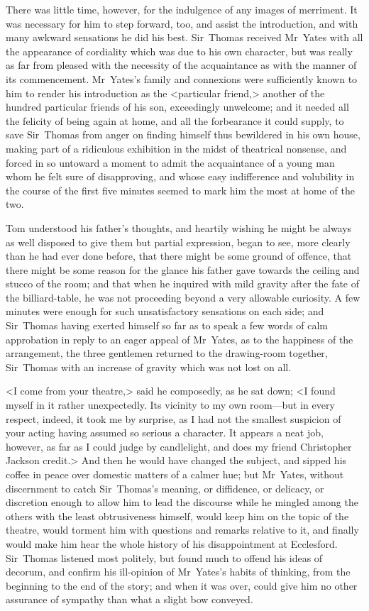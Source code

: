 There was little time, however, for the indulgence of any images of merriment. It was necessary for him to step forward, too, and assist the introduction, and with many awkward sensations he did his best. Sir~Thomas received Mr~Yates with all the appearance of cordiality which was due to his own character, but was really as far from pleased with the necessity of the acquaintance as with the manner of its commencement. Mr~Yates's family and connexions were sufficiently known to him to render his introduction as the <particular friend,> another of the hundred particular friends of his son, exceedingly unwelcome; and it needed all the felicity of being again at home, and all the forbearance it could supply, to save Sir~Thomas from anger on finding himself thus bewildered in his own house, making part of a ridiculous exhibition in the midst of theatrical nonsense, and forced in so untoward a moment to admit the acquaintance of a young man whom he felt sure of disapproving, and whose easy indifference and volubility in the course of the first five minutes seemed to mark him the most at home of the two.

Tom understood his father's thoughts, and heartily wishing he might be always as well disposed to give them but partial expression, began to see, more clearly than he had ever done before, that there might be some ground of offence, that there might be some reason for the glance his father gave towards the ceiling and stucco of the room; and that when he inquired with mild gravity after the fate of the billiard-table, he was not proceeding beyond a very allowable curiosity. A few minutes were enough for such unsatisfactory sensations on each side; and Sir~Thomas having exerted himself so far as to speak a few words of calm approbation in reply to an eager appeal of Mr~Yates, as to the happiness of the arrangement, the three gentlemen returned to the drawing-room together, Sir~Thomas with an increase of gravity which was not lost on all.

<I come from your theatre,> said he composedly, as he sat down; <I found myself in it rather unexpectedly. Its vicinity to my own room—but in every respect, indeed, it took me by surprise, as I had not the smallest suspicion of your acting having assumed so serious a character. It appears a neat job, however, as far as I could judge by candlelight, and does my friend Christopher Jackson credit.> And then he would have changed the subject, and sipped his coffee in peace over domestic matters of a calmer hue; but Mr~Yates, without discernment to catch Sir~Thomas's meaning, or diffidence, or delicacy, or discretion enough to allow him to lead the discourse while he mingled among the others with the least obtrusiveness himself, would keep him on the topic of the theatre, would torment him with questions and remarks relative to it, and finally would make him hear the whole history of his disappointment at Ecclesford. Sir~Thomas listened most politely, but found much to offend his ideas of decorum, and confirm his ill-opinion of Mr~Yates's habits of thinking, from the beginning to the end of the story; and when it was over, could give him no other assurance of sympathy than what a slight bow conveyed.

